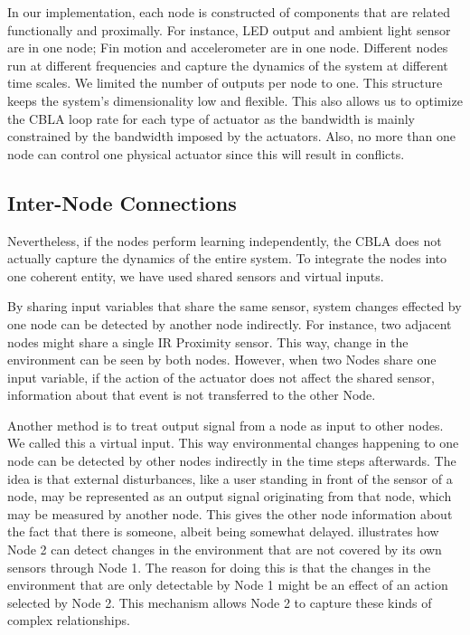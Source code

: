 In our implementation, each node is constructed of components that are related functionally and proximally. For instance, LED output and ambient light sensor are in one node; Fin motion and accelerometer are in one node. Different nodes run at different frequencies and capture the dynamics of the system at different time scales. We limited the number of outputs per node to one. This structure keeps the system's dimensionality low and flexible. This also allows us to optimize the CBLA loop rate for each type of actuator as the bandwidth is mainly constrained by the bandwidth imposed by the actuators. Also, no more than one node can control one physical actuator since this will result in conflicts. 

\subsection{Inter-Node Connections}\label{sec:inter-node connections}

Nevertheless, if the nodes perform learning independently, the CBLA does not actually capture the dynamics of the entire system. To integrate the nodes into one coherent entity, we have used shared sensors and virtual inputs.

By sharing input variables that share the same sensor, system changes effected by one node can be detected by another node indirectly. For instance, two adjacent nodes might share a single IR Proximity sensor. This way, change in the environment can be seen by both nodes. However, when two Nodes share one input variable, if the action of the actuator does not affect the shared sensor, information about that event is not transferred to the other Node. 

Another method is to treat output signal from a node as input to other nodes. We called this a virtual input. This way environmental changes happening to one node can be detected by other nodes indirectly in the time steps afterwards. The idea is that external disturbances, like a user standing in front of the sensor of a node, may be represented as an output signal originating from that node, which may be measured by another node. This gives the other node information about the fact that there is someone, albeit being somewhat delayed.  illustrates how Node 2 can detect changes in the environment that are not covered by its own sensors through Node 1. The reason for doing this is that the changes in the environment that are only detectable by Node 1 might be an effect of an action selected by Node 2. This mechanism allows Node 2 to capture these kinds of complex relationships.


